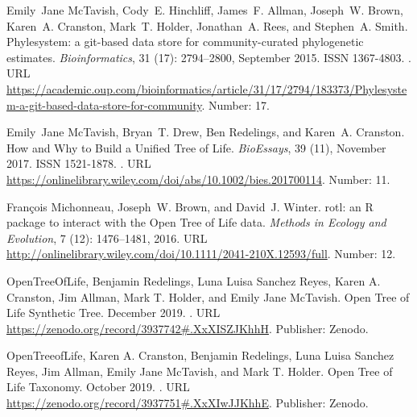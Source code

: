 \documentclass[oupdraft]{sysbio_sse}
\begin{document}
\begin{thebibliography}{18}
Emily~Jane McTavish, Cody~E. Hinchliff, James~F. Allman, Joseph~W. Brown,
  Karen~A. Cranston, Mark~T. Holder, Jonathan~A. Rees, and Stephen~A. Smith.
\newblock Phylesystem: a git-based data store for community-curated
  phylogenetic estimates.
\newblock \emph{Bioinformatics}, 31 (17): 2794--2800,
  September 2015.
\newblock ISSN 1367-4803.
\newblock {}.
\newblock URL
  \url{https://academic.oup.com/bioinformatics/article/31/17/2794/183373/Phylesystem-a-git-based-data-store-for-community}.
\newblock Number: 17.

Emily~Jane McTavish, Bryan~T. Drew, Ben Redelings, and Karen~A. Cranston.
\newblock How and {Why} to {Build} a {Unified} {Tree} of {Life}.
\newblock \emph{BioEssays}, 39 (11), November 2017.
\newblock ISSN 1521-1878.
\newblock {}.
\newblock URL
  \url{https://onlinelibrary.wiley.com/doi/abs/10.1002/bies.201700114}.
\newblock Number: 11.

François Michonneau, Joseph~W. Brown, and David~J. Winter.
\newblock rotl: an {R} package to interact with the {Open} {Tree} of {Life}
  data.
\newblock \emph{Methods in Ecology and Evolution}, 7 (12):
  1476--1481, 2016.
\newblock URL
  \url{http://onlinelibrary.wiley.com/doi/10.1111/2041-210X.12593/full}.
\newblock Number: 12.

{OpenTreeOfLife}, {Benjamin Redelings}, {Luna Luisa Sanchez Reyes}, {Karen A.
  Cranston}, {Jim Allman}, {Mark T. Holder}, and {Emily Jane McTavish}.
\newblock Open {Tree} of {Life} {Synthetic} {Tree}.
\newblock December 2019.
\newblock {}.
\newblock URL \url{https://zenodo.org/record/3937742#.XxXISZJKhhH}.
\newblock Publisher: Zenodo.

{OpenTreeofLife}, {Karen A. Cranston}, {Benjamin Redelings}, {Luna Luisa
  Sanchez Reyes}, {Jim Allman}, {Emily Jane McTavish}, and {Mark T. Holder}.
\newblock Open {Tree} of {Life} {Taxonomy}.
\newblock October 2019.
\newblock {}.
\newblock URL \url{https://zenodo.org/record/3937751#.XxXIwJJKhhE}.
\newblock Publisher: Zenodo.


\end{thebibliography}
\end{document}
